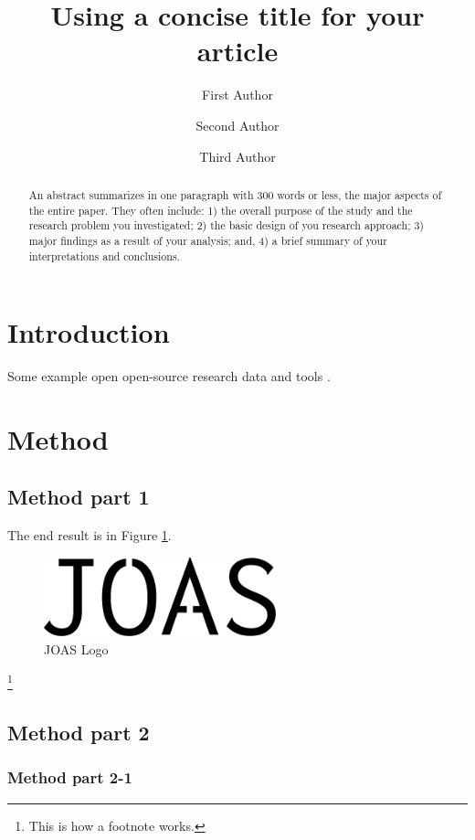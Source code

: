 \documentclass[
  manuscript=proceedings,  %
  layout=preprint,  %
  year=20xx,
  volume=x,
]{extra/joas}
\title{Using a concise title for your article}
\author{First Author}
\affiliation{Institution-1, City, Country}
\author{Second Author}
\affiliation{Institution-2, City, Country}
\author{Third Author}
\affiliation{Institution-3, City, Country}
\begin{document}
\begin{abstract}
  An abstract summarizes in one paragraph with 300 words or less, the major aspects of the entire paper. They often include: 1) the overall purpose of the study and the research problem you investigated; 2) the basic design of you research approach; 3) major findings as a result of your analysis; and, 4) a brief summary of your interpretations and conclusions. 
\end{abstract}


\section{Introduction}

\blindtext 
Some example open open-source research data \cite{schafer2014bringing} and tools \cite{olive2019traffic}. 


\blindtext [2]


\section{Method}

\subsection{Method part 1}

\blindtext The end result is in Figure \ref{fig:logo}.

\begin{figure}[ht!]
  \centering
  \includegraphics[width=0.6\textwidth]{extra/joas-logo.pdf}
  \caption{JOAS Logo}
  \label{fig:logo}
\end{figure}

\blindtext\footnote{This is how a footnote works.}

\subsection{Method part 2}

\subsubsection{Method part 2-1}
\end{document}
